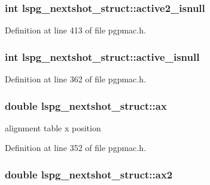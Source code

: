 \hypertarget{structlspg__nextshot__struct_a1aa11ff4a4c8d69695786b4349e84e6b}{
\subsubsection[{active2\-\_\-isnull}]{\setlength{\rightskip}{0pt plus 5cm}int lspg\-\_\-nextshot\-\_\-struct\-::active2\-\_\-isnull}}\label{structlspg__nextshot__struct_a1aa11ff4a4c8d69695786b4349e84e6b}


Definition at line 413 of file pgpmac.\-h.

\hypertarget{structlspg__nextshot__struct_a9f777671ec617a0f533b3c51f28babb3}{
\subsubsection[{active\-\_\-isnull}]{\setlength{\rightskip}{0pt plus 5cm}int lspg\-\_\-nextshot\-\_\-struct\-::active\-\_\-isnull}}\label{structlspg__nextshot__struct_a9f777671ec617a0f533b3c51f28babb3}


Definition at line 362 of file pgpmac.\-h.

\hypertarget{structlspg__nextshot__struct_a7f57874223897ab7d9c7531a9522904d}{
\subsubsection[{ax}]{\setlength{\rightskip}{0pt plus 5cm}double lspg\-\_\-nextshot\-\_\-struct\-::ax}}\label{structlspg__nextshot__struct_a7f57874223897ab7d9c7531a9522904d}


alignment table x position 



Definition at line 352 of file pgpmac.\-h.

\hypertarget{structlspg__nextshot__struct_ab76bd38d2a098bc7eda82aff5dcb9c66}{
\subsubsection[{ax2}]{\setlength{\rightskip}{0pt plus 5cm}double lspg\-\_\-nextshot\-\_\-struct\-::ax2}}\label{structlspg__nextshot__struct_ab76bd38d2a098bc7eda82aff5dcb9c66}



